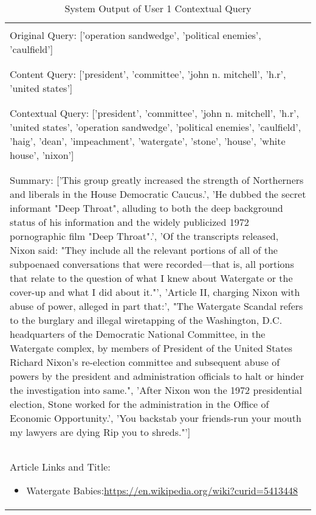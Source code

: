\begin{table}[h]
    \caption{System Output of User 1 Contextual Query}
    \label{tab:u1}
    \centering
    \begin{tabular}{ Y } \hline \\
    Original Query: ['operation sandwedge', 'political enemies', 'caulfield'] \Tstrut\Bstrut\\ \\ \hline \\
    Content Query: ['president', 'committee', 'john n. mitchell', 'h.r', 'united states']\Tstrut\Bstrut\\ \\ \hline \\
    Contextual Query: ['president', 'committee', 'john n. mitchell', 'h.r', 'united states', 'operation sandwedge', 'political enemies', 'caulfield', 'haig', 'dean', 'impeachment', 'watergate', 'stone', 'house', 'white house', 'nixon'] \Tstrut\Bstrut\\ \\ \hline \\ 
    Summary: ['This group greatly increased the strength of Northerners and liberals in the House Democratic Caucus.', 'He dubbed the secret informant "Deep Throat", alluding to both the deep background status of his information and the widely publicized 1972 pornographic film "Deep Throat".', 'Of the transcripts released, Nixon said: "They include all the relevant portions of all of the subpoenaed conversations that were recorded—that is, all portions that relate to the question of what I knew about Watergate or the cover-up and what I did about it."', 'Article II, charging Nixon with abuse of power, alleged in part that:', "The Watergate Scandal refers to the burglary and illegal wiretapping of the Washington, D.C. headquarters of the Democratic National Committee, in the Watergate complex, by members of President of the United States Richard Nixon's re-election committee and subsequent abuse of powers by the president and administration officials to halt or hinder the investigation into same.", 'After Nixon won the 1972 presidential election, Stone worked for the administration in the Office of Economic Opportunity.', 'You backstab your friends-run your mouth my lawyers are dying Rip you to shreds."']\Tstrut\Bstrut\\ \\ \hline \\ 
    Article Links and Title: \begin{itemize}
        \itemsep0em 
        \item Watergate Babies:\url{https://en.wikipedia.org/wiki?curid=5413448}

\end{itemize}
\end{tabular}
\end{table}
